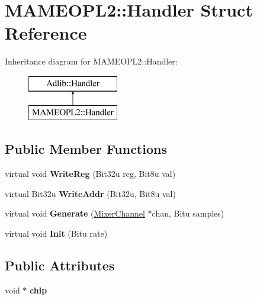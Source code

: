 \hypertarget{structMAMEOPL2_1_1Handler}{\section{M\-A\-M\-E\-O\-P\-L2\-:\-:Handler Struct Reference}
\label{structMAMEOPL2_1_1Handler}
}
Inheritance diagram for M\-A\-M\-E\-O\-P\-L2\-:\-:Handler\-:\begin{figure}[H]
\begin{center}
\leavevmode
\includegraphics[height=2.000000cm]{structMAMEOPL2_1_1Handler}
\end{center}
\end{figure}
\subsection*{Public Member Functions}
\begin{DoxyCompactItemize}
\item 
\hypertarget{structMAMEOPL2_1_1Handler_a9432a798ae5818d012a865b4ec05efbb}{virtual void {\bfseries Write\-Reg} (Bit32u reg, Bit8u val)}\label{structMAMEOPL2_1_1Handler_a9432a798ae5818d012a865b4ec05efbb}

\item 
\hypertarget{structMAMEOPL2_1_1Handler_a697cf8d3aaa763a99ca01c51b193a152}{virtual Bit32u {\bfseries Write\-Addr} (Bit32u, Bit8u val)}\label{structMAMEOPL2_1_1Handler_a697cf8d3aaa763a99ca01c51b193a152}

\item 
\hypertarget{structMAMEOPL2_1_1Handler_a825d60c8d94af76fb466f980725ebe79}{virtual void {\bfseries Generate} (\hyperlink{classMixerChannel}{Mixer\-Channel} $\ast$chan, Bitu samples)}\label{structMAMEOPL2_1_1Handler_a825d60c8d94af76fb466f980725ebe79}

\item 
\hypertarget{structMAMEOPL2_1_1Handler_ae1ae4dd98b7022333e50505a8b36d78f}{virtual void {\bfseries Init} (Bitu rate)}\label{structMAMEOPL2_1_1Handler_ae1ae4dd98b7022333e50505a8b36d78f}

\end{DoxyCompactItemize}
\subsection*{Public Attributes}
\begin{DoxyCompactItemize}
\item 
\hypertarget{structMAMEOPL2_1_1Handler_aaeb8b2c151dadaf5968466398c0baacb}{void $\ast$ {\bfseries chip}}\label{structMAMEOPL2_1_1Handler_aaeb8b2c151dadaf5968466398c0baacb}

\end{DoxyCompactItemize}


